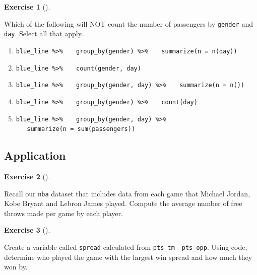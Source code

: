 \documentclass[
  letterpaper,
  DIV=11,
  numbers=noendperiod]{scrreprt}
\theoremstyle{definition}
\newtheorem{exercise}{Exercise}[chapter]
\theoremstyle{remark}
\begin{document}
\begin{exercise}[]\protect\hypertarget{exr-ch03-c11}{}\label{exr-ch03-c11}

Which of the following will NOT count the number of passengers by
\texttt{gender} and \texttt{day}. Select all that apply.

\begin{enumerate}
\def\labelenumi{\alph{enumi})}
\item
  \texttt{blue\_line\ \%\textgreater{}\%}
  \texttt{~~~group\_by(gender)\ \%\textgreater{}\%}
  \texttt{~~~summarize(n\ =\ n(day))}
\item
  \texttt{blue\_line\ \%\textgreater{}\%}
  \texttt{~~~count(gender,\ day)}
\item
  \texttt{blue\_line\ \%\textgreater{}\%}
  \texttt{~~~group\_by(gender,\ day)\ \%\textgreater{}\%}
  \texttt{~~~summarize(n\ =\ n())}
\item
  \texttt{blue\_line\ \%\textgreater{}\%}
  \texttt{~~~group\_by(gender)\ \%\textgreater{}\%}
  \texttt{~~~count(day)}
\item
  \texttt{blue\_line\ \%\textgreater{}\%}
  \texttt{~~~group\_by(gender,\ day)\ \%\textgreater{}\%}
  \texttt{~~~summarize(n\ =\ sum(passengers))}
\end{enumerate}

\end{exercise}

\hypertarget{sec-ex03-application}{%
\subsection{Application}\label{sec-ex03-application}}

\begin{exercise}[]\protect\hypertarget{exr-ch03-app1}{}\label{exr-ch03-app1}

Recall our \texttt{nba} dataset that includes data from each game that
Michael Jordan, Kobe Bryant and Lebron James played. Compute the average
number of free throws made per game by each player.

\end{exercise}

\begin{exercise}[]\protect\hypertarget{exr-ch03-app2}{}\label{exr-ch03-app2}

Create a variable called \texttt{spread} calculated from
\texttt{pts\_tm} - \texttt{pts\_opp}. Using code, determine who played
the game with the largest win spread and how much they won by.

\end{exercise}
\end{document}
